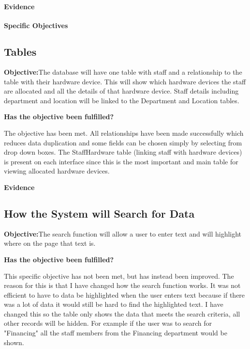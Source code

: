 \textbf{Evidence}



\paragraph{Specific Objectives}

\subsection{Tables}

\textbf{Objective:}The database will have one table with staff and a relationship to the table with their hardware device. This will show which hardware devices the staff are allocated and all the details of that hardware device. Staff details including department and location will be linked to the Department and Location tables.

\textbf{Has the objective been fulfilled?}

The objective has been met. All relationships have been made successfully which reduces data duplication and some fields can be chosen simply by selecting from drop down boxes. The StaffHardware table (linking staff with hardware devices) is present on each interface since this is the most important and main table for viewing allocated hardware devices.

\textbf{Evidence}



\subsection{How the System will Search for Data}

\textbf{Objective:}The search function will allow a user to enter text and will highlight where on the page that text is.

\textbf{Has the objective been fulfilled?}

This specific objective has not been met, but has instead been improved. The reason for this is that I have changed how the search function works. It was not efficient to have to data be highlighted when the user enters text because if there was a lot of data it would still be hard to find the highlighted text. I have changed this so the table only shows the data that meets the search criteria, all other records will be hidden. For example if the user was to search for "Financing" all the staff members from the Financing department would be shown.


